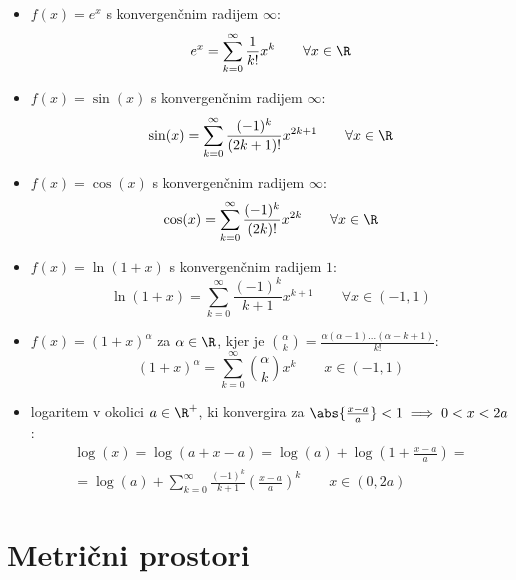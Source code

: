\documentclass[12pt, a4paper, unicode]{article}
\begin{document}
\begin{naloga}
\begin{itemize}
    \item $f(x) = e^x$ s konvergenčnim radijem $\infty$: $$e^x = \sum_{k=0}^{\infty} \frac{1}{k!}x^k \quad \quad \forall x \in \R$$
    \item $f(x) = \sin(x)$ s konvergenčnim radijem $\infty$: $$\sin(x)=  \sum_{k=0}^\infty \frac{(-1)^k}{(2k+1)!}x^{2k+1} \quad \quad \forall x \in \R$$
    \item $f(x) = \cos(x)$ s konvergenčnim radijem $\infty$: $$\cos(x)=  \sum_{k=0}^\infty \frac{(-1)^k}{(2k)!}x^{2k} \quad \quad \forall x \in \R$$
    \item $f(x) = \ln(1+x)$ s konvergenčnim radijem $1$: $$\ln(1+x) = \sum_{k=0}^{\infty} \frac{(-1)^k}{k+1} x^{k+1} \quad \quad \forall x \in (-1,1)$$
    \item $f(x) = (1+x)^\alpha$ za $\alpha \in \R$, kjer je $\binom{\alpha}{k} = \frac{\alpha(\alpha-1)\dots(\alpha-k+1)}{k!}$: $$(1+x)^\alpha = \sum_{k=0}^\infty \binom{\alpha}{k}x^k \quad \quad x \in (-1,1)$$
    \item logaritem v okolici $a \in \R^+$, ki konvergira za $\abs{\frac{x-a}{a}} < 1 \implies 0 < x < 2a$: 
    \begin{multline*}
    \log(x) = \log(a+x-a) = \log(a) + \log\left(1+\frac{x-a}{a}\right)=\\ = \log(a) + \sum_{k=0}^\infty \frac{(-1)^k}{k+1}\left( \frac{x-a}{a}\right)^k \quad \quad x \in (0,2a) \quad \quad
    \end{multline*}
\end{itemize}
\end{naloga}


\newpage
\section{Metrični prostori}
\end{document}
